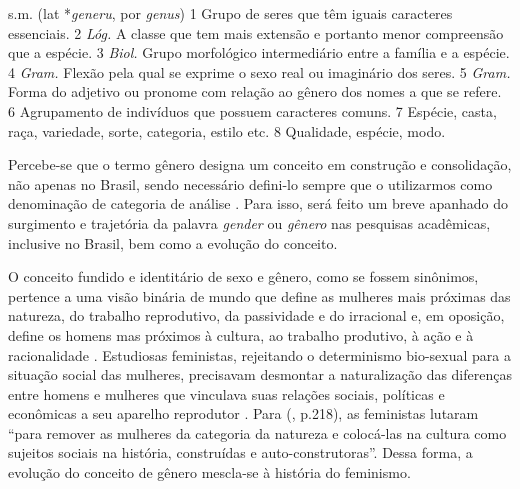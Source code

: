 \begin{citacao}
s.m. (lat *\emph{generu}, por \emph{genus}) 1 Grupo de seres que têm iguais caracteres essenciais. 2 \emph{Lóg.} A classe que tem mais extensão e portanto menor compreensão que a espécie. 3 \emph{Biol.} Grupo morfológico intermediário entre a família e a espécie. 4 \emph{Gram.} Flexão pela qual se exprime o sexo real ou imaginário dos seres. 5 \emph{Gram.} Forma do adjetivo ou pronome com relação ao gênero dos nomes a que se refere. 6 Agrupamento de indivíduos que possuem caracteres comuns. 7 Espécie, casta, raça, variedade, sorte, categoria, estilo etc. 8 Qualidade, espécie, modo.
\end{citacao}

Percebe-se que o termo gênero designa um conceito em construção e consolidação, não apenas no Brasil, sendo necessário defini-lo sempre que o utilizarmos como denominação de categoria de análise \cite{MORAES1998}. Para isso, será feito um breve apanhado do surgimento e trajetória da palavra \emph{gender} ou \emph{gênero} nas pesquisas acadêmicas, inclusive no Brasil, bem como a evolução do conceito.

O conceito fundido e identitário de sexo e gênero, como se fossem sinônimos, pertence a uma visão binária de mundo que define as mulheres mais próximas das natureza, do trabalho reprodutivo, da passividade e do irracional e, em oposição, define os homens mas próximos à cultura, ao trabalho produtivo, à ação e à racionalidade \cite{HARAWAY2004}.
Estudiosas feministas, rejeitando o determinismo bio-sexual para a situação social das mulheres, precisavam desmontar a naturalização das diferenças entre homens e mulheres que vinculava suas relações sociais, políticas e econômicas a seu aparelho reprodutor \cite{PISCITELLI2009}. 
Para  (\citeyear{HARAWAY2004}, p.218), as feministas lutaram ``para remover as mulheres da categoria da natureza e colocá-las na cultura como sujeitos sociais na história, construídas e auto-construtoras''. Dessa forma, a evolução do conceito de gênero mescla-se à história do feminismo.

